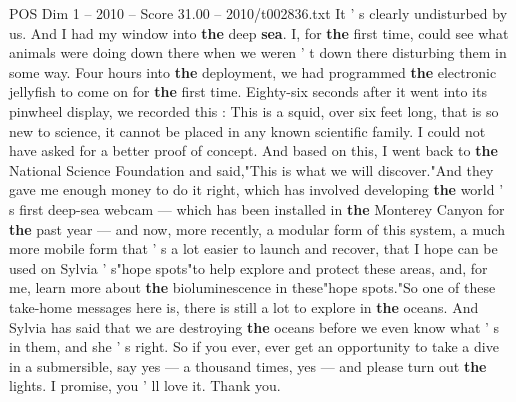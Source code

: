 \begin{textsample}{POS Dim 1 – 2010 – Score 31.00 – 2010/t002836.txt}
It ' s clearly undisturbed by us.
And I had my window into \textbf{the} deep \textbf{sea}.
I, for \textbf{the} first time, could see what animals were doing down there when we weren ' t down there disturbing them in some way.
Four hours into \textbf{the} deployment, we had programmed \textbf{the} electronic jellyfish to come on for \textbf{the} first time.
Eighty-six seconds after it went into its pinwheel display, we recorded this : This is a squid, over six feet long, that is so new to science, it cannot be placed in any known scientific family.
I could not have asked for a better proof of concept.
And based on this, I went back to \textbf{the} National Science Foundation and said,"This is what we will discover."And they gave me enough money to do it right, which has involved developing \textbf{the} world ' s first deep-sea webcam — which has been installed in \textbf{the} Monterey Canyon for \textbf{the} past year — and now, more recently, a modular form of this system, a much more mobile form that ' s a lot easier to launch and recover, that I hope can be used on Sylvia ' s"hope spots"to help explore and protect these areas, and, for me, learn more about \textbf{the} bioluminescence in these"hope spots."So one of these take-home messages here is, there is still a lot to explore in \textbf{the} oceans.
And Sylvia has said that we are destroying \textbf{the} oceans before we even know what ' s in them, and she ' s right.
So if you ever, ever get an opportunity to take a dive in a submersible, say yes — a thousand times, yes — and please turn out \textbf{the} lights.
I promise, you ' ll love it.
Thank you.

\end{textsample}

